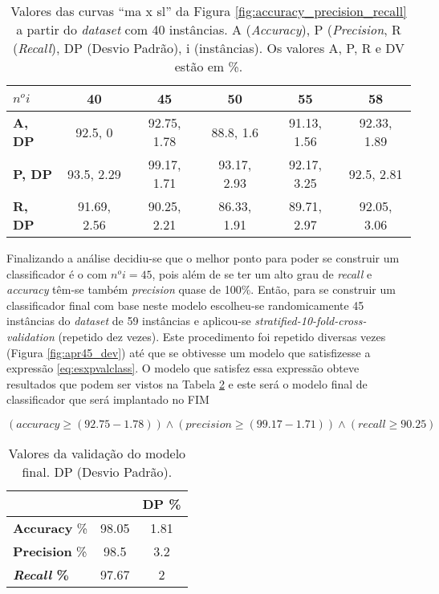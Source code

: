 \begin{table}[!htp]
  \centering
  \begin{tabular}{ |l|c c c c c|}
    \hline
       {\bf \textbf{$n^o i$}} & {\bf 40} & {\bf 45} & {\bf 50} & {\bf 55} & {\bf 58} \\
    \hline
       \textbf{A, DP} & 92.5, 0 & 92.75, 1.78 & 88.8, 1.6 & 91.13, 1.56 & 92.33, 1.89 \\
    \hline
       \textbf{P, DP} & 93.5, 2.29 & 99.17, 1.71 & 93.17, 2.93 &  92.17, 3.25 & 92.5, 2.81 \\
    \hline
       \textbf{R, DP} & 91.69, 2.56 & 90.25, 2.21 & 86.33, 1.91 & 89.71, 2.97 & 92.05, 3.06 \\
    \hline
  \end{tabular}
  \caption{Valores das curvas ``ma x sl'' da Figura \ref{fig:accuracy_precision_recall} a partir do \textit{dataset} com 40 instâncias. A (\textit{Accuracy}), P (\textit{Precision}, R (\textit{Recall}), DP (Desvio Padrão), i (instâncias). Os valores A, P, R e DV estão em \%.}
  \label{table:valorescurva}
\end{table}

Finalizando a análise decidiu-se que o melhor ponto para poder se construir um classificador é o com $n^o i = 45$, pois além de se ter um alto grau de \textit{recall} e \textit{accuracy} têm-se também \textit{precision} quase de 100\%. Então, para se construir um classificador final com base neste modelo escolheu-se randomicamente 45 instâncias do \textit{dataset} de 59 instâncias e aplicou-se \textit{stratified-10-fold-cross-validation} (repetido dez vezes). Este procedimento foi repetido diversas vezes (Figura \ref{fig:apr45_dev}) até que se obtivesse um modelo que satisfizesse a expressão \ref{eq:esxpvalclass}. O modelo que satisfez essa expressão obteve resultados que podem ser vistos na Tabela \ref{table:valmodelfinal} e este será o modelo final de classificador que será implantado no FIM 

\begin{equation}
  (\textit{accuracy} \geq (92.75-1.78)) \wedge (\textit{precision} \geq (99.17-1.71)) \wedge (\textit{recall} \geq 90.25)
  \label{eq:esxpvalclass}
\end{equation}

\begin{table}[!htp]
  \centering
  \begin{tabular}{ |l|c|c|}
    \hline
       {\bf } & {\bf } & {\bf DP \%} \\
    \hline
       \textbf{Accuracy} \% & 98.05 & 1.81 \\
    \hline
       \textbf{Precision} \% & 98.5 & 3.2 \\
    \hline
       \textbf{\textit{Recall} \%} & 97.67 & 2 \\
    \hline
  \end{tabular}
  \caption{Valores da validação do modelo final. DP (Desvio Padrão).}
  \label{table:valmodelfinal}
\end{table}

